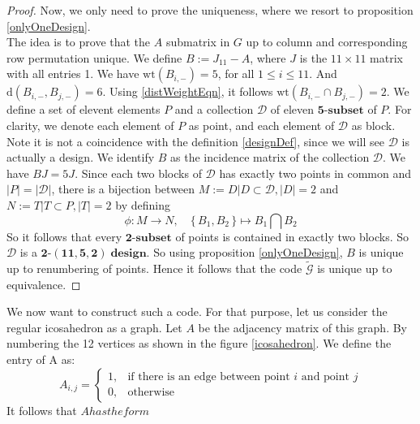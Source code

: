 \documentclass{article}
\numberwithin{equation}{theorem}
\numberwithin{figure}{theorem}
\newcommand{\tParamDesign}[4]{\ensuremath{\bm{#1\mbox{-}(#2,#3,#4)\; design}}}
\newcommand{\dDes}{\ensuremath{\mathscr{D}}}
\newcommand{\cCodes}{\ensuremath{\widetilde{\mathscr{G}}}}
\newcommand{\tSubset}[1]{\ensuremath{\bm{#1\mbox{-}{subset}}}}
\newcommand{\wt}[1]{\ensuremath{\text{wt}(#1)}}
\newcommand{\dist}[2]{\ensuremath{\text{d}(#1,#2)}}
\begin{document}
\begin{proof}
Now, we only need to prove the uniqueness, where we resort to proposition \ref{onlyOneDesign}.\\
The idea is to prove that the $A$ submatrix in $G$ up to column and corresponding row permutation %
unique. We define $B := J_{11} - A$, where $J$ is the $11 \times 11$ matrix with all entries 1. We have $\wt{B_{i,-}} = 5$, for all $1 \leq i \leq 11$. And $\dist{B_{i,-}}{B_{j,-}} = 6$. Using \ref{distWeightEqn}, it follows $\wt{B_{i,-} \cap B_{j,-}} = 2$. We define a set of elevent elements $P$ and a collection {\dDes} of eleven {\tSubset{5}} of $P$. For clarity, we denote each element of $P$ as point, and each element of {\dDes} as block. Note it is not a coincidence with the definition \ref{designDef}, since we will see {\dDes} is actually a design. We identify $B$ as the incidence matrix of the collection {\dDes}. We have $BJ = 5J$. Since each two blocks of {\dDes} has exactly two points in common and $|P| = |\dDes|$, there is a bijection between $M  := {D| D \subset \dDes, |D| = 2}$ and $N := {T|T \subset P, |T| = 2}$ by defining 
\[
	\phi: M \rightarrow N, \quad \{\,B_1,B_2\,\} \mapsto B_1 \bigcap B_2
\]
So it follows that every {\tSubset{2}} of points is contained in exactly two blocks. So {\dDes} is a {\tParamDesign{2}{11}{5}{2}}. So using proposition \ref{onlyOneDesign}, $B$ is unique up to renumbering of points. Hence it follows that the code {\cCodes} is unique up to equivalence.
\end{proof}

We now want to construct such a code. For that purpose, let us consider the regular icosahedron as a graph. Let $A$ be the adjacency matrix of this graph. By numbering the 12 vertices as shown in the figure \ref{icosahedron}. We define the entry of A as:
\[
	A_{i,j} = 
	\begin{cases}
		1, &\text{if there is an edge between point $i$ and point $j$}\\
		0, &\text{otherwise}
	\end{cases}
\]
It follows that $A has the form$
\end{document}

